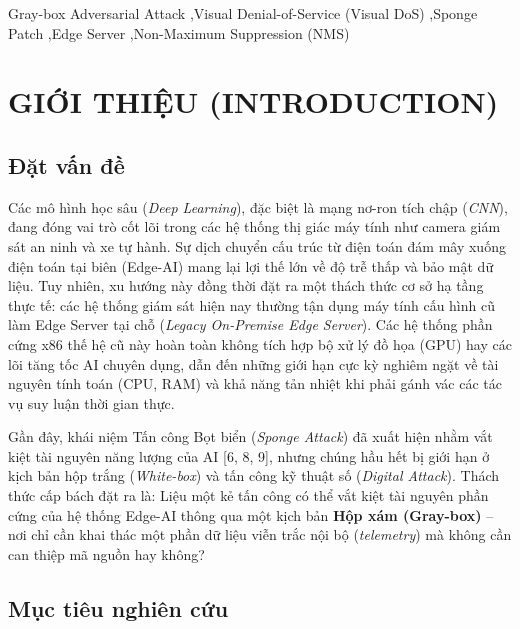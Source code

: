 \documentclass[a4paper,fleqn]{cas-dc}
\begin{document}
\begin{keywords}
Gray-box Adversarial Attack \sep Visual Denial-of-Service (Visual DoS) \sep Sponge Patch \sep Edge Server \sep Non-Maximum Suppression (NMS)
\end{keywords}

\maketitle

\section{GIỚI THIỆU (INTRODUCTION)}



\subsection{Đặt vấn đề}



Các mô hình học sâu (\emph{Deep Learning}), đặc biệt là mạng nơ-ron tích
chập (\emph{CNN}), đang đóng vai trò cốt lõi trong các hệ thống thị giác
máy tính như camera giám sát an ninh và xe tự hành. Sự dịch chuyển cấu
trúc từ điện toán đám mây xuống điện toán tại biên (Edge-AI) mang lại
lợi thế lớn về độ trễ thấp và bảo mật dữ liệu. Tuy nhiên, xu hướng này
đồng thời đặt ra một thách thức cơ sở hạ tầng thực tế: các hệ thống giám
sát hiện nay thường tận dụng máy tính cấu hình cũ làm Edge Server tại
chỗ (\emph{Legacy On-Premise Edge Server}). Các hệ thống phần cứng x86
thế hệ cũ này hoàn toàn không tích hợp bộ xử lý đồ họa (GPU) hay các lõi
tăng tốc AI chuyên dụng, dẫn đến những giới hạn cực kỳ nghiêm ngặt về
tài nguyên tính toán (CPU, RAM) và khả năng tản nhiệt khi phải gánh vác
các tác vụ suy luận thời gian thực.

Gần đây, khái niệm Tấn công Bọt biển (\emph{Sponge Attack}) đã xuất hiện
nhằm vắt kiệt tài nguyên năng lượng của AI {[}6, 8, 9{]}, nhưng chúng
hầu hết bị giới hạn ở kịch bản hộp trắng (\emph{White-box}) và tấn công
kỹ thuật số (\emph{Digital Attack}). Thách thức cấp bách đặt ra là: Liệu
một kẻ tấn công có thể vắt kiệt tài nguyên phần cứng của hệ thống
Edge-AI thông qua một kịch bản \textbf{Hộp xám (Gray-box)} -- nơi chỉ
cần khai thác một phần dữ liệu viễn trắc nội bộ (\emph{telemetry}) mà
không cần can thiệp mã nguồn hay không?

\subsection{Mục tiêu nghiên cứu}
\end{document}
